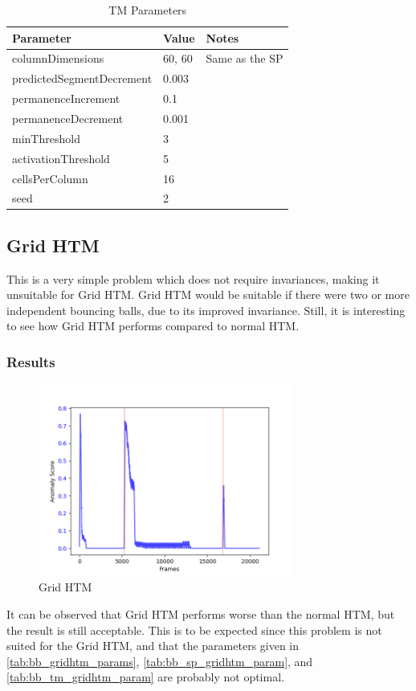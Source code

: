 \begin{table}[H]
    \centering
    \begin{tabularx}{\linewidth}{@{}llX@{}}
        \toprule
        \textbf{Parameter}        & \textbf{Value} & \textbf{Notes} \\
        \midrule
        columnDimensions          & 60, 60         & Same as the SP \\
        predictedSegmentDecrement & 0.003          &                \\
        permanenceIncrement       & 0.1            &                \\
        permanenceDecrement       & 0.001          &                \\
        minThreshold              & 3              &                \\
        activationThreshold       & 5              &                \\
        cellsPerColumn            & 16             &                \\
        seed                      & 2              &                \\
        \bottomrule
    \end{tabularx}

    \caption{TM Parameters}
    \label{tab:bb_TM_params}
\end{table}
\subsection{Grid HTM}
This is a very simple problem which does not require invariances, making it unsuitable for Grid HTM. Grid HTM would be suitable if there were two or more independent bouncing balls, due to its improved invariance. Still, it is interesting to see how Grid HTM performs compared to normal HTM.
\subsubsection{Results}
\begin{figure}[H]
    \centering
    \includegraphics[width=0.75\textwidth]{resources/experiments/bouncing_ball/bb_grid.png}
    \caption{Grid HTM}
\end{figure}
It can be observed that Grid HTM performs worse than the normal HTM, but the result is still acceptable. This is to be expected since this problem is not suited for the Grid HTM, and that the parameters given in \autoref{tab:bb_gridhtm_params}, \autoref{tab:bb_sp_gridhtm_param}, and \autoref{tab:bb_tm_gridhtm_param} are probably not optimal.
